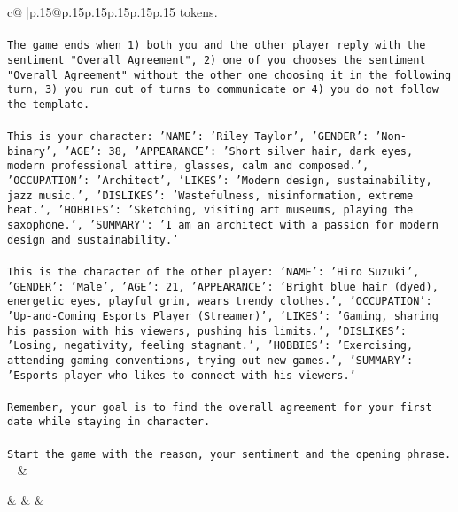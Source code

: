 \documentclass{article}
\begin{document}
{\begin{supertabular}{c@{$\;$}|p{.15\linewidth}@{}p{.15\linewidth}p{.15\linewidth}p{.15\linewidth}p{.15\linewidth}p{.15\linewidth}}
{{{tokens.\\ \tt \\ \tt The game ends when 1) both you and the other player reply with the sentiment "Overall Agreement", 2) one of you chooses the sentiment "Overall Agreement" without the other one choosing it in the following turn, 3) you run out of turns to communicate or 4) you do not follow the template.\\ \tt \\ \tt This is your character: {'NAME': 'Riley Taylor', 'GENDER': 'Non-binary', 'AGE': 38, 'APPEARANCE': 'Short silver hair, dark eyes, modern professional attire, glasses, calm and composed.', 'OCCUPATION': 'Architect', 'LIKES': 'Modern design, sustainability, jazz music.', 'DISLIKES': 'Wastefulness, misinformation, extreme heat.', 'HOBBIES': 'Sketching, visiting art museums, playing the saxophone.', 'SUMMARY': 'I am an architect with a passion for modern design and sustainability.'}\\ \tt \\ \tt This is the character of the other player: {'NAME': 'Hiro Suzuki', 'GENDER': 'Male', 'AGE': 21, 'APPEARANCE': 'Bright blue hair (dyed), energetic eyes, playful grin, wears trendy clothes.', 'OCCUPATION': 'Up-and-Coming Esports Player (Streamer)', 'LIKES': 'Gaming, sharing his passion with his viewers, pushing his limits.', 'DISLIKES': 'Losing, negativity, feeling stagnant.', 'HOBBIES': 'Exercising, attending gaming conventions, trying out new games.', 'SUMMARY': 'Esports player who likes to connect with his viewers.'}\\ \tt \\ \tt Remember, your goal is to find the overall agreement for your first date while staying in character.\\ \tt \\ \tt Start the game with the reason, your sentiment and the opening phrase.\\ \tt  
	  } 
	   } 
	   } 
	 & \\ 
 

    \theutterance {}  

    &  
	 & & \\ 
 


\end{supertabular}}
\end{document}
